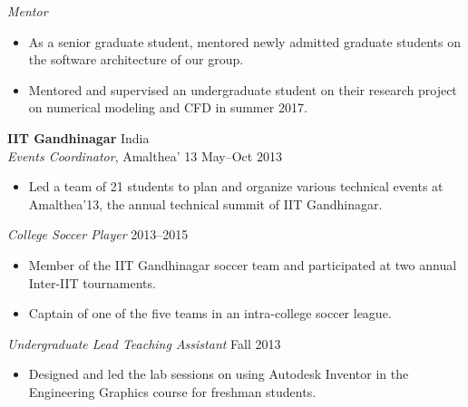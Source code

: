 \documentclass[margin]{res}
\begin{document}
\begin{resume}
{\it Mentor}
\begin{itemize}
	\item As a senior graduate student, mentored newly admitted graduate students on the software architecture of our group.
	\item Mentored and supervised an undergraduate student on their research project on numerical modeling and CFD in summer 2017.
\end{itemize}

{\bf IIT Gandhinagar} \hfill India\\
{\it Events Coordinator}, Amalthea' 13 \hfill May--Oct 2013
\begin{itemize}
	\item Led a team of 21 students to plan and organize various technical events at Amalthea'13, the annual technical summit of IIT Gandhinagar.
\end{itemize}

{\it College Soccer Player} \hfill 2013--2015
\begin{itemize}
	\item Member of the IIT Gandhinagar soccer team and participated at two annual Inter-IIT tournaments.
	\item Captain of one of the five teams in an intra-college soccer league.
\end{itemize}

{\it Undergraduate Lead Teaching Assistant} \hfill Fall 2013
\begin{itemize}
	\item Designed and led the lab sessions on using Autodesk Inventor in the Engineering Graphics course for freshman students.
\end{itemize}

%
%

\end{resume}
\end{document}
